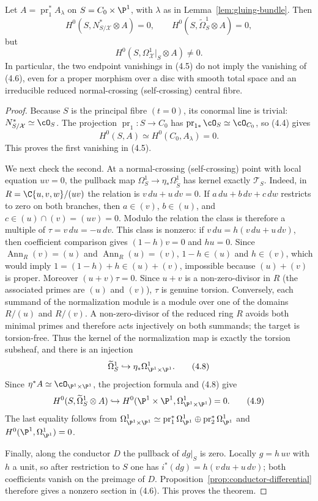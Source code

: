 \begin{theorem}
\label{thm:nodal-test}
Let $A=\operatorname{pr}_1^*A_\lambda$ on
$S=C_0\times\P^1$, with $\lambda$ as in Lemma~\ref{lem:gluing-bundle}.
Then
\[
 H^0(S,N^*_{S/\mathcal X}\otimes A)=0,
 \qquad
 H^0(S,\widetilde\Omega^1_S\otimes A)=0,
 \tag{4.5}
\]
but
\[
 H^0(S,\Omega^1_{\mathcal X}|_S\otimes A)\ne0.
 \tag{4.6}
\]
In particular, the two endpoint vanishings in (4.5) do not imply the
vanishing of (4.6), even for a proper morphism over a disc with smooth total
space and an irreducible reduced normal-crossing (self-crossing) central
fibre.
\end{theorem}

\begin{proof}
Because $S$ is the principal fibre $(t=0)$, its conormal line is trivial:
\(N^*_{S/\mathcal X}\simeq\cO_S\).  The projection
\(\operatorname{pr}_1:S\to C_0\) has
\(\operatorname{pr}_{1*}\cO_S\simeq\cO_{C_0}\), so (4.4) gives
\[
 H^0(S,A)\simeq H^0(C_0,A_\lambda)=0.
 \tag{4.7}
\]
This proves the first vanishing in (4.5).

We next check the second.  At a normal-crossing (self-crossing) point with local equation
\(uv=0\), the pullback map
\(\Omega^1_S\to\eta_*\Omega^1_{\widetilde S}\) has kernel exactly
\(\mathscr T_S\).  Indeed, in
\(R=\C\{u,v,w\}/(uv)\) the relation is
\(v\,du+u\,dv=0\).  If
\(a\,du+b\,dv+c\,dw\) restricts to zero on both branches, then
\(a\in(v)\), \(b\in(u)\), and
\(c\in(u)\cap(v)=(uv)=0\).  Modulo the relation the class is therefore a
multiple of $\tau=v\,du=-u\,dv$.  This class is nonzero: if
\(v\,du=h(v\,du+u\,dv)\), then coefficient comparison gives
  \((1-h)v=0\) and $hu=0$.  Since
\(\operatorname{Ann}_R(v)=(u)\) and \(\operatorname{Ann}_R(u)=(v)\),
\(1-h\in(u)\) and \(h\in(v)\), which would imply
\(1=(1-h)+h\in(u)+(v)\), impossible because $(u)+(v)$ is proper.
Moreover $(u+v)\tau=0$.  Since $u+v$ is a non-zero-divisor in
$R$ (the associated primes are $(u)$ and $(v)$), $\tau$ is genuine
torsion.
Conversely, each summand of the normalization module is a module over one of
the domains $R/(u)$ and $R/(v)$.  A non-zero-divisor of the reduced ring $R$
avoids both minimal primes and therefore acts injectively on both summands;
the target is torsion-free.  Thus the kernel of the normalization map is
exactly the torsion subsheaf, and there is an injection
\[
 \widetilde\Omega^1_S\hookrightarrow\eta_*\Omega^1_{\P^1\times\P^1}.
 \tag{4.8}
\]
Since $\eta^*A\simeq\cO_{\P^1\times\P^1}$, the projection formula and (4.8)
give
\[
 H^0(S,\widetilde\Omega^1_S\otimes A)
 \hookrightarrow
 H^0(\P^1\times\P^1,\Omega^1_{\P^1\times\P^1})=0.
 \tag{4.9}
\]
The last equality follows from
\(\Omega^1_{\P^1\times\P^1}\simeq
\operatorname{pr}_1^*\Omega^1_{\P^1}\oplus
\operatorname{pr}_2^*\Omega^1_{\P^1}\) and
\(H^0(\P^1,\Omega^1_{\P^1})=0\).

Finally, along the conductor $D$ the pullback of $dg|_S$ is zero.  Locally
$g=h\,uv$ with $h$ a unit, so after restriction to $S$ one has
$i^*(dg)=h(v\,du+u\,dv)$; both coefficients vanish on the preimage of $D$.
Proposition~\ref{prop:conductor-differential}
therefore gives a nonzero section in (4.6).  This proves the theorem.
\end{proof}

